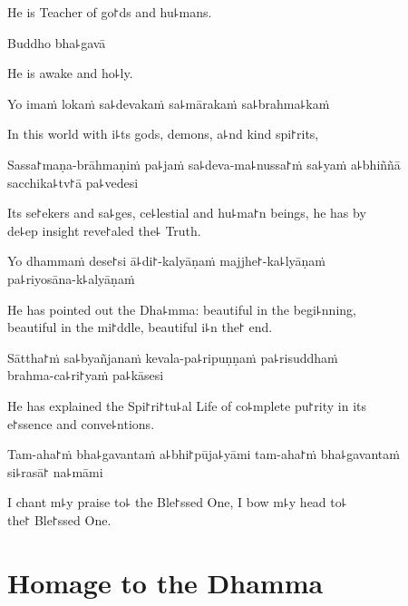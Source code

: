 \begin{english}
  He is Teacher of go꜓ds and hu꜕mans.
\end{english}

Buddho bha꜕gavā

\begin{english}
  He is awake and ho꜕ly.
\end{english}

Yo imaṁ lokaṁ sa꜕devakaṁ sa꜕mārakaṁ sa꜕brahma꜕kaṁ

\begin{english}
  In this world with i꜕ts gods, demons, a꜕nd kind spi꜓rits,
\end{english}

Sassa꜓maṇa-brāhmaṇiṁ pa꜕jaṁ sa꜕deva-ma꜕nussa꜓ṁ sa꜕yaṁ a꜕bhiññā sacchika꜕tv꜓ā pa꜕vedesi

\begin{english}
  Its se꜓ekers and sa꜕ges, ce꜕lestial and hu꜕ma꜓n beings, he has by \\de꜕ep insight reve꜓aled the꜕ Truth.
\end{english}

Yo dhammaṁ dese꜓si ā꜕di꜓-kalyāṇaṁ majjhe꜓-ka꜕lyāṇaṁ \\pa꜕riyosāna-k꜕alyāṇaṁ

\begin{english}
  He has pointed out the Dha꜕mma: beautiful in the begi꜕nning, \\beautiful in the mi꜓ddle, beautiful i꜕n the꜓ end.
\end{english}

Sāttha꜓ṁ sa꜕byañjanaṁ kevala-pa꜕ripuṇṇaṁ pa꜕risuddhaṁ \\brahma-ca꜕ri꜓yaṁ pa꜕kāsesi

\begin{english}
  He has explained the Spi꜓ri꜓tu꜕al Life of co꜕mplete pu꜓rity in its \\e꜓ssence and conve꜕ntions.
\end{english}

Tam-aha꜓ṁ bha꜕gavantaṁ a꜕bhi꜓pūja꜕yāmi tam-aha꜓ṁ bha꜕gavantaṁ \\si꜕rasā꜓ na꜕māmi

\begin{english}
  I chant m꜕y praise to꜕ the Ble꜓ssed One, I bow m꜕y head to꜕ \\the꜓ Ble꜓ssed One.
\end{english}

\clearpage

\chapter{Homage to the Dhamma}

